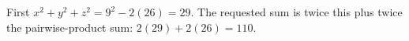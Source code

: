 First $x^2+y^2+z^2=9^2-2(26)=29$. The requested sum is twice this plus twice the pairwise-product sum: $2(29)+2(26)=\boxed{110}$.
